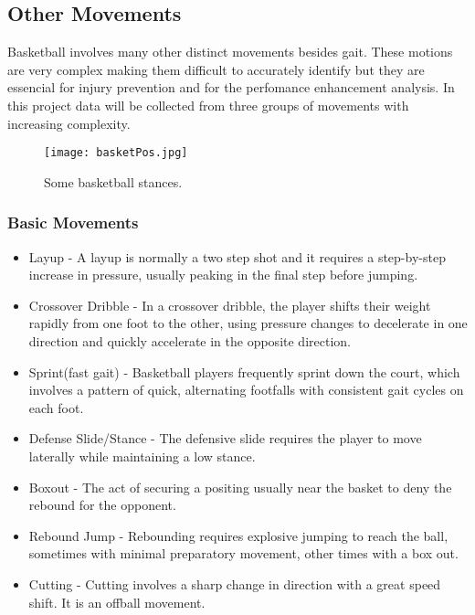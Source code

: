 \newpage

\subsection{Other Movements}
\label{ssec:other_movements}

Basketball involves many other distinct movements besides gait. These motions are very complex making them difficult to accurately identify 
but they are essencial for injury prevention and for the perfomance enhancement analysis. In this project data will be collected from three groups of movements with increasing complexity.

\begin{figure}[htbp]
  \centering
  \texttt{[image: basketPos.jpg]}
  \caption{Some basketball stances.}
  \label{fig:basketPos}
\end{figure}

\subsubsection{Basic Movements}
\label{sssec:basic_movements}

\begin{itemize}
  \item Layup - A layup is normally a two step shot and it requires a step-by-step increase in pressure, usually peaking in the final step before jumping.
  \item Crossover Dribble - In a crossover dribble, the player shifts their weight rapidly from one foot to the other, using pressure changes to decelerate in one direction and quickly accelerate in the opposite direction.
  \item Sprint(fast gait) - Basketball players frequently sprint down the court, which involves a pattern of quick, alternating footfalls with consistent gait cycles on each foot.
  \item Defense Slide/Stance - The defensive slide requires the player to move laterally while maintaining a low stance.
  \item Boxout - The act of securing a positing usually near the basket to deny the rebound for the opponent.
  \item Rebound Jump - Rebounding requires explosive jumping to reach the ball, sometimes with minimal preparatory movement, other times with a box out.
  \item Cutting - Cutting involves a sharp change in direction with a great speed shift. It is an offball movement.
  
\end{itemize}

